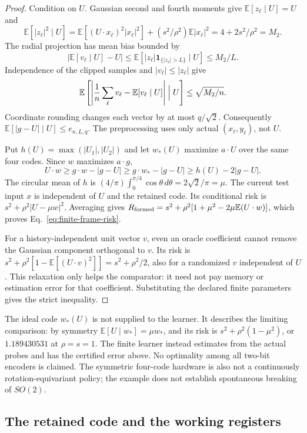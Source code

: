 \documentclass[12pt]{article}
\theoremstyle{definition}
\newcommand{\E}{\mathbb E}
\begin{document}
\begin{proof}
Condition on $U$. Gaussian second and fourth moments give
$\E[z_\ell\mid U]=U$ and
\[
 \E[|z_\ell|^2\mid U]
 =\E[(U\cdot x_\ell)^2|x_\ell|^2]
             +(s^2/\rho^2)\E|x_\ell|^2
 =4+2s^2/\rho^2=M_2.
\]
The radial projection has mean bias bounded by
\[
 |\E[v_\ell\mid U]-U|
 \le\E[|z_\ell|\mathbf1_{\{|z_\ell|>L\}}\mid U]\le M_2/L.
\]
Independence of the clipped samples and $|v_\ell|\le|z_\ell|$ give
\[
 \E\left[\left|
 \frac1n\sum_\ell v_\ell-\E[v_\ell\mid U]\right|\Bigm|U\right]
 \le\sqrt{M_2/n}.
\]
Coordinate rounding changes each vector by at most $q/\sqrt2$.
Consequently $\E[|g-U|\mid U]\le e_{n,L,q}$.
The preprocessing uses only actual $(x_\ell,y_\ell)$, not $U$.

Put $h(U)=\max(|U_1|,|U_2|)$ and let $w_*(U)$ maximize $a\cdot U$
over the same four codes. Since $w$ maximizes $a\cdot g$,
\[
 U\cdot w\ge g\cdot w-|g-U|
       \ge g\cdot w_*-|g-U|
       \ge h(U)-2|g-U|.
\]
The circular mean of $h$ is
$(4/\pi)\int_0^{\pi/4}\cos\theta\,d\theta=2\sqrt2/\pi=\mu$.
The current test input $x$ is independent of $U$ and the retained code.
Its conditional risk is
$s^2+\rho^2|U-\mu w|^2$.
Averaging gives
$R_{\rm formed}=s^2+\rho^2[1+\mu^2-2\mu\E(U\cdot w)]$,
which proves Eq.~\eqref{eq:finite-frame-risk}.

For a history-independent unit vector $v$, even an oracle coefficient
cannot remove the Gaussian component orthogonal to $v$.
Its risk is $s^2+\rho^2[1-\E[(U\cdot v)^2]]=s^2+\rho^2/2$,
also for a randomized $v$ independent of $U$.
This relaxation only helps the comparator: it need not pay memory or
estimation error for that coefficient.
Substituting the declared finite parameters gives the strict inequality.
\end{proof}

The ideal code $w_*(U)$ is not supplied to the learner.
It describes the limiting comparison: by symmetry
$\E[U\mid w_*]=\mu w_*$, and its risk is
$s^2+\rho^2(1-\mu^2)$, or $1.189430531$ at $\rho=s=1$.
The finite learner instead estimates from the actual probes and has
the certified error above. No optimality among all two-bit encoders
is claimed. The symmetric four-code hardware is also not a
continuously rotation-equivariant policy; the example does not
establish spontaneous breaking of $SO(2)$.

\subsection{The retained code and the working registers}
\end{document}
